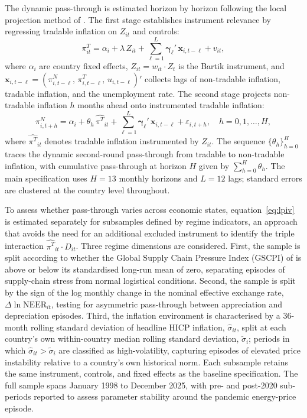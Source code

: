\documentclass[a4paper,12pt]{article}
\begin{document}
The dynamic pass-through is estimated horizon by horizon following the local projection method of . The first stage establishes instrument relevance by regressing tradable inflation on $Z_{it}$ and controls:
\begin{equation}
    \pi^T_{it}
    = \alpha_i
    + \lambda\, Z_{it}
    + \sum_{\ell=1}^{L} \boldsymbol{\gamma}_\ell'\, \mathbf{x}_{i,t-\ell}
    + v_{it},
    \label{eq:firststage}
\end{equation}
where $\alpha_i$ are country fixed effects, $Z_{it} = w_{it}\cdot Z_t$ is the Bartik instrument, and $\mathbf{x}_{i,t-\ell} = (\pi^N_{i,t-\ell},\,\pi^T_{i,t-\ell},\,u_{i,t-\ell})'$ collects lags of non-tradable inflation, tradable inflation, and the unemployment rate. The second stage projects non-tradable inflation $h$ months ahead onto instrumented tradable inflation:
\begin{equation}
    \pi^N_{i,t+h}
    = \alpha_i
    + \theta_h\,\widehat{\pi^T}_{it}
    + \sum_{\ell=1}^{L} \boldsymbol{\gamma}_\ell'\, \mathbf{x}_{i,t-\ell}
    + \varepsilon_{i,t+h},
    \quad h = 0, 1, \ldots, H,
    \label{eq:lpiv}
\end{equation}
where $\widehat{\pi^T}_{it}$ denotes tradable inflation instrumented by $Z_{it}$. The sequence $\{\theta_h\}_{h=0}^{H}$ traces the dynamic second-round pass-through from tradable to non-tradable inflation, with cumulative pass-through at horizon $H$ given by $\sum_{h=0}^{H}\theta_h$. The main specification uses $H = 13$ monthly horizons and $L = 12$ lags; standard errors are clustered at the country level throughout.

To assess whether pass-through varies across economic states, equation~\eqref{eq:lpiv} is estimated separately for subsamples defined by regime indicators, an approach that avoids the need for an additional excluded instrument to identify the triple interaction $\widehat{\pi^T}_{it} \cdot D_{it}$. Three regime dimensions are considered. First, the sample is split according to whether the Global Supply Chain Pressure Index (GSCPI) of  is above or below its standardised long-run mean of zero, separating episodes of supply-chain stress from normal logistical conditions. Second, the sample is split by the sign of the log monthly change in the nominal effective exchange rate, $\Delta\ln\mathrm{NEER}_{it}$, testing for asymmetric pass-through between appreciation and depreciation episodes. Third, the inflation environment is characterised by a 36-month rolling standard deviation of headline HICP inflation, $\hat{\sigma}_{it}$, split at each country's own within-country median rolling standard deviation, $\tilde{\sigma}_i$; periods in which $\hat{\sigma}_{it} > \tilde{\sigma}_i$ are classified as high-volatility, capturing episodes of elevated price instability relative to a country's own historical norm. Each subsample retains the same instrument, controls, and fixed effects as the baseline specification. The full sample spans January 1998 to December 2025, with pre- and post-2020 sub-periods reported to assess parameter stability around the pandemic energy-price episode.
\end{document}
